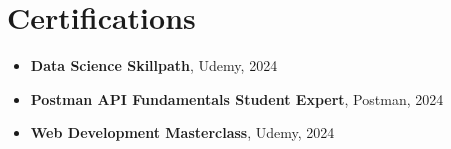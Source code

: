 \section{Certifications}
\begin{itemize}[leftmargin=1.5em]
    \item \textbf{Data Science Skillpath}, Udemy, 2024
    \item \textbf{Postman API Fundamentals Student Expert}, Postman, 2024
    \item \textbf{Web Development Masterclass}, Udemy, 2024
\end{itemize}
